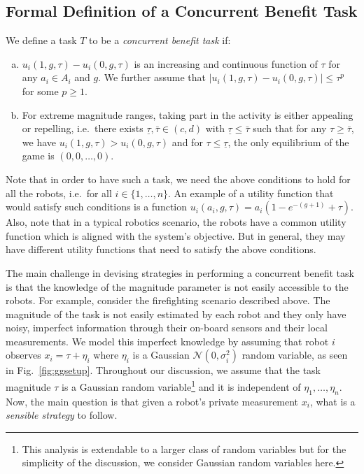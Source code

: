 \documentclass[conference]{ieeeconf}
\begin{document}
\subsection{Formal Definition of a Concurrent Benefit Task}\label{subsec:conbenefitdef}
We define a task $T$ to be a \emph{concurrent benefit task} if: 
\begin{enumerate}[a.]
	\item $u_i(1,g,\tau)-u_i(0,g,\tau)$ is an increasing and continuous function of $\tau$ for any $a_i\in A_i$ and $g$. We further assume that $|u_i(1,g,\tau)-u_i(0,g,\tau)|\leq \tau^p$ for some $p\geq 1$. 
	\item For extreme magnitude ranges, taking part in the activity is either appealing or repelling, i.e.\ there exists $\underline{\tau},\bar{\tau}\in (c,d)$ with $\underline{\tau}\leq \bar{\tau}$ such that for any $\tau\geq \bar{\tau}$, we have $u_i(1,g,\tau)>u_i(0,g,\tau)$ and for $\tau\leq \underline{\tau}$, the only equilibrium of the game is $(0,0,\ldots,0)$. 
\end{enumerate}

Note that in order to have such a task, we need the above conditions to hold for all the robots, i.e.\ for all $i\in\{1,\ldots,n\}$.
An example of a utility function that would satisfy such conditions is a function $u_i(a_i,g,\tau)=a_i(1-e^{-(g+1)}+\tau)$. Also, note that in a typical robotics scenario, the robots have a common utility function which is aligned with the system's objective. But in general, they may have different utility functions that need to satisfy the above conditions. 

The main challenge in devising strategies in performing a concurrent benefit task is that the knowledge of the magnitude parameter is not easily accessible to the robots. For example, consider the firefighting scenario described above. The magnitude of the task is not easily estimated by each robot and they only have noisy, imperfect information through their on-board sensors and their local measurements.  We model this imperfect knowledge by assuming that robot $i$ observes $x_i=\tau+\eta_i$ where $\eta_i$ is a Gaussian $\mathcal{N}(0,\sigma_i^2)$ random variable, as seen in Fig.~\ref{fig:ggsetup}. Throughout our discussion, we assume that the task magnitude $\tau$ is a Gaussian random variable\footnote{This analysis is extendable to a larger class of random variables but for the simplicity of the discussion, we consider Gaussian random variables here.} and it is independent of $\eta_1,\ldots,\eta_n$. Now, the main question is that given a robot's private measurement $x_i$, what is a \emph{sensible strategy} to follow. 
\end{document}
